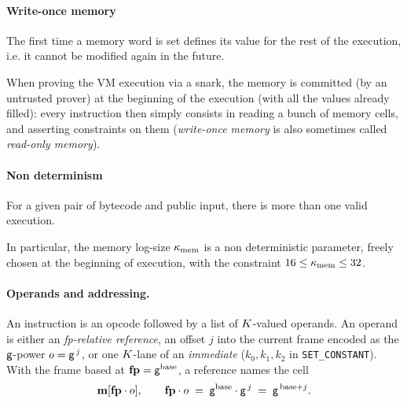 \paragraph{Write-once memory}

The first time a memory word is set defines its value for the rest of the execution, i.e. it cannot be modified again in the future.

When proving the VM execution via a snark, the memory is committed (by an untrusted prover) at the beginning of the execution (with all the values already filled): every instruction then simply consists in reading a bunch of memory cells, and asserting constraints on them (\textit{write-once memory} is also sometimes called \textit{read-only memory}).

\paragraph{Non determinism}

For a given pair of bytecode and public input, there is more than one valid execution.

In particular, the memory log-size $\kappa_{\mathrm{mem}}$ is a non deterministic parameter, freely chosen at the beginning of execution, with the constraint $16\le\kappa_{\mathrm{mem}}\le 32$.

\paragraph{Operands and addressing.} An instruction is an opcode followed by a list of $K$-valued operands. An operand is either an \emph{fp-relative reference}, an offset $j$ into the current frame encoded as the $\mathsf{g}$-power $o=\mathsf{g}^{\,j}$, or one $K$-lane of an \emph{immediate} ($k_0,k_1,k_2$ in \texttt{SET\_CONSTANT}). With the frame based at $\mathbf{fp}=\mathsf{g}^{\mathrm{base}}$, a reference names the cell
\[
  \mathbf{m}[\mathbf{fp}\cdot o],\qquad \mathbf{fp}\cdot o\;=\;\mathsf{g}^{\mathrm{base}}\cdot\mathsf{g}^{\,j}\;=\;\mathsf{g}^{\,\mathrm{base}+j}.
\]

